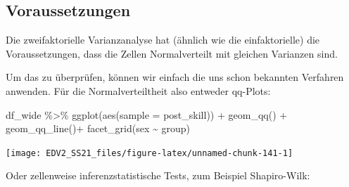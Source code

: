 \documentclass[
]{book}
\newenvironment{Shaded}{\begin{snugshade}}{\end{snugshade}}
\newcommand{\AttributeTok}[1]{\textcolor[rgb]{0.77,0.63,0.00}{#1}}
\newcommand{\DecValTok}[1]{\textcolor[rgb]{0.00,0.00,0.81}{#1}}
\newcommand{\FunctionTok}[1]{\textcolor[rgb]{0.00,0.00,0.00}{#1}}
\newcommand{\NormalTok}[1]{#1}
\newcommand{\OtherTok}[1]{\textcolor[rgb]{0.56,0.35,0.01}{#1}}
\newcommand{\SpecialCharTok}[1]{\textcolor[rgb]{0.00,0.00,0.00}{#1}}
\newcommand{\StringTok}[1]{\textcolor[rgb]{0.31,0.60,0.02}{#1}}
\begin{document}
\hypertarget{voraussetzungen}{%
\subsection{Voraussetzungen}\label{voraussetzungen}}

Die zweifaktorielle Varianzanalyse hat (ähnlich wie die einfaktorielle) die Voraussetzungen, dass die Zellen Normalverteilt mit gleichen Varianzen sind.

Um das zu überprüfen, können wir einfach die uns schon bekannten Verfahren anwenden. Für die Normalverteiltheit also entweder qq-Plots:

\begin{Shaded}
\begin{Highlighting}[]
\NormalTok{df\_wide }\SpecialCharTok{\%\textgreater{}\%} 
  \FunctionTok{ggplot}\NormalTok{(}\FunctionTok{aes}\NormalTok{(}\AttributeTok{sample =}\NormalTok{ post\_skill)) }\SpecialCharTok{+}
  \FunctionTok{geom\_qq}\NormalTok{() }\SpecialCharTok{+}
  \FunctionTok{geom\_qq\_line}\NormalTok{()}\SpecialCharTok{+}
  \FunctionTok{facet\_grid}\NormalTok{(sex }\SpecialCharTok{\textasciitilde{}}\NormalTok{ group) }
\end{Highlighting}
\end{Shaded}

\begin{center}\texttt{[image: EDV2\_SS21\_files/figure-latex/unnamed-chunk-141-1]} \end{center}

Oder zellenweise inferenzstatistische Tests, zum Beispiel Shapiro-Wilk:

\begin{Shaded}
\end{Shaded}
\end{document}
